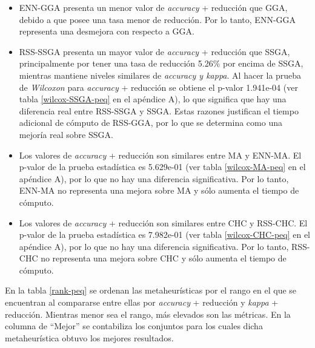 \begin{itemize}
 
\item ENN-GGA presenta un menor valor de \emph{accuracy} + reducción que GGA, debido a que posee una tasa menor de reducción. Por lo tanto, ENN-GGA representa una desmejora con respecto a GGA.

\item RSS-SSGA presenta un mayor valor de \emph{accuracy} + reducción que SSGA, principalmente por tener una tasa de reducción 5.26\% por encima de SSGA, mientras mantiene niveles similares de \emph{accuracy y kappa}. Al hacer la prueba de \emph{Wilcoxon} para \emph{accuracy} + reducción se obtiene el p-valor 1.941e-04 (ver tabla \ref{wilcox-SSGA-peq} en el apéndice A), lo que significa que hay una diferencia real entre RSS-SSGA y SSGA. Estas razones justifican el tiempo adicional de cómputo de RSS-GGA, por lo que se determina como una mejoría real sobre SSGA.

\item Los valores de \emph{accuracy} + reducción son similares entre MA y ENN-MA. El p-valor de la prueba estadística es 5.629e-01 (ver tabla \ref{wilcox-MA-peq} en el apéndice A), por lo que no hay una diferencia significativa. Por lo tanto, ENN-MA no representa una mejora sobre MA y sólo aumenta el tiempo de cómputo.

\item  Los valores de \emph{accuracy} + reducción son similares entre CHC y RSS-CHC. El p-valor de la prueba estadística es 7.982e-01 (ver tabla \ref{wilcox-CHC-peq} en el apéndice A), por lo que no hay una diferencia significativa. Por lo tanto, RSS-CHC no representa una mejora sobre CHC y sólo aumenta el tiempo de cómputo.

\end{itemize}

\newpage

En la tabla \ref{rank-peq} se ordenan las metaheurísticas por el rango en el que se encuentran al compararse entre ellas por \emph{accuracy} + reducción y \emph{kappa} + reducción. Mientras menor sea el rango, más elevados son las métricas. En la columna de ``Mejor'' se contabiliza los conjuntos para los cuales dicha metaheurística obtuvo los mejores resultados.

